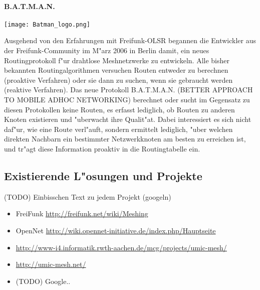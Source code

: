 \paragraph{B.A.T.M.A.N.}

\texttt{[image: Batman\_logo.png]}

Ausgehend von den Erfahrungen mit Freifunk-OLSR begannen die Entwickler
aus der Freifunk-Community im M"arz 2006 in Berlin damit, ein neues
Routingprotokoll f"ur drahtlose Meshnetzwerke zu entwickeln. Alle bisher
bekannten Routingalgorithmen versuchen Routen entweder zu berechnen
(proaktive Verfahren) oder sie dann zu suchen, wenn sie gebraucht werden
(reaktive Verfahren). Das neue Protokoll B.A.T.M.A.N. 
(BETTER APPROACH TO MOBILE ADHOC NETWORKING) berechnet oder
sucht im Gegensatz zu diesen Protokollen keine Routen, es erfasst
lediglich, ob Routen zu anderen Knoten existieren und "uberwacht ihre
Qualit"at. Dabei interessiert es sich nicht daf"ur, wie eine Route verl"auft,
sondern ermittelt lediglich, "uber welchen direkten Nachbarn ein bestimmter
Netzwerkknoten am besten zu erreichen ist, und tr"agt diese Information
proaktiv in die Routingtabelle ein. 


\subsection{Existierende L"osungen und Projekte}

(TODO) Einbisschen Text zu jedem Projekt (googeln)

\begin{itemize}
\item FreiFunk \url{http://freifunk.net/wiki/Meshing}
\item OpenNet \url{http://wiki.opennet-initiative.de/index.php/Hauptseite}
\item \url{http://www-i4.informatik.rwth-aachen.de/mcg/projects/umic-mesh/} 
\item \url{http://umic-mesh.net/}
\item (TODO) Google..

\end{itemize}
